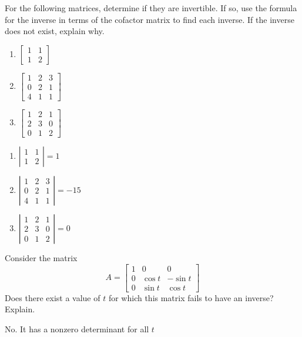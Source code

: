 \documentclass{ximera}
\begin{document}
\begin{problem}\label{prb:7.31} For the following matrices, determine if they are invertible. If so, use the formula for the inverse in terms of the cofactor matrix to
find each inverse. If the inverse does not exist, explain why.
\begin{enumerate}
\item
$\left[
\begin{array}{rr}
1 & 1 \\
1 & 2
\end{array}
\right]$
\item
$\left[
\begin{array}{rrr}
1 & 2 & 3 \\
0 & 2 & 1 \\
4 & 1 & 1
\end{array}
\right]$
\item
$\left[
\begin{array}{rrr}
1 & 2 & 1 \\
2 & 3 & 0 \\
0 & 1 & 2
\end{array}
\right] $
\end{enumerate}
\begin{hint}
\begin{enumerate}
\item $\left\vert
\begin{array}{cc}
1 & 1 \\
1 & 2
\end{array}
\right\vert = 1$
\item $\left\vert
\begin{array}{ccc}
1 & 2 & 3 \\
0 & 2 & 1 \\
4 & 1 & 1%
\end{array}
\right\vert = -15$
\item $\left\vert
\begin{array}{ccc}
1 & 2 & 1 \\
2 & 3 & 0 \\
0 & 1 & 2
\end{array}
\right\vert = 0$
\end{enumerate}
\end{hint}
\end{problem}

\begin{problem}\label{prb:7.32} Consider the matrix
\begin{equation*}
A =
\left[
\begin{array}{ccc}
1 & 0 & 0 \\
0 & \cos t & -\sin t \\
0 & \sin t & \cos t
\end{array}
\right]
\end{equation*}
Does there exist a value of $t$ for which this matrix fails to have an
inverse? Explain.
\begin{hint}
 No. It has a nonzero determinant for all $t$
\end{hint}
\end{problem}
\end{document}
